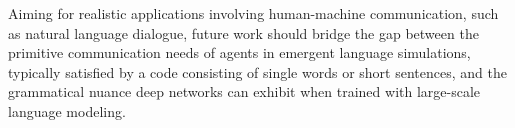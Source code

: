 

Aiming for realistic applications involving human-machine communication, such as natural language dialogue, future work should bridge the gap between the primitive communication
needs of agents in emergent language simulations, typically satisfied
by a code consisting of single words or short sentences, and the
grammatical nuance deep networks can exhibit when trained with large-scale language
modeling.  



